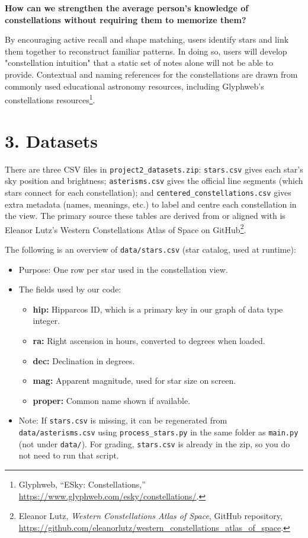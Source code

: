 \documentclass[11pt]{article}
\begin{document}
\textbf{How can we strengthen the average person's knowledge of constellations without requiring them to memorize them?}

By encouraging active recall and shape matching, users identify stars and link them together to reconstruct familiar patterns. In doing so, users will develop "constellation intuition" that a static set of notes alone will not be able to provide. Contextual and naming references for the constellations are drawn from commonly used educational astronomy resources, including Glyphweb's constellations resources\footnote{Glyphweb, ``ESky: Constellations,'' \url{https://www.glyphweb.com/esky/constellations/}.}.

\section*{3. Datasets}

There are three CSV files in \texttt{project2\_datasets.zip}: \texttt{stars.csv} gives each star's sky position and brightness; \texttt{asterisms.csv} gives the official line segments (which stars connect for each constellation); and \texttt{centered\_constellations.csv} gives extra metadata (names, meanings, etc.) to label and centre each constellation in the view. The primary source these tables are derived from or aligned with is Eleanor Lutz's Western Constellations Atlas of Space on GitHub\footnote{Eleanor Lutz, \emph{Western Constellations Atlas of Space}, GitHub repository, \url{https://github.com/eleanorlutz/western_constellations_atlas_of_space}.}.

The following is an overview of \texttt{data/stars.csv} (star catalog, used at runtime):

\begin{itemize}
    \item Purpose: One row per star used in the constellation view.

    \item The fields used by our code:
    \begin{itemize}
        \item \textbf{hip:} Hipparcos ID, which is a primary key in our graph of data type integer.
        \item \textbf{ra:} Right ascension in hours, converted to degrees when loaded.
        \item \textbf{dec:} Declination in degrees.
        \item \textbf{mag:} Apparent magnitude, used for star size on screen.
        \item \textbf{proper:} Common name shown if available.
    \end{itemize}
    \item Note: If \texttt{stars.csv} is missing, it can be regenerated from \texttt{data/asterisms.csv} using \texttt{process\_stars.py} in the same folder as \texttt{main.py} (not under \texttt{data/}). For grading, \texttt{stars.csv} is already in the zip, so you do not need to run that script.
\end{itemize}
\end{document}
